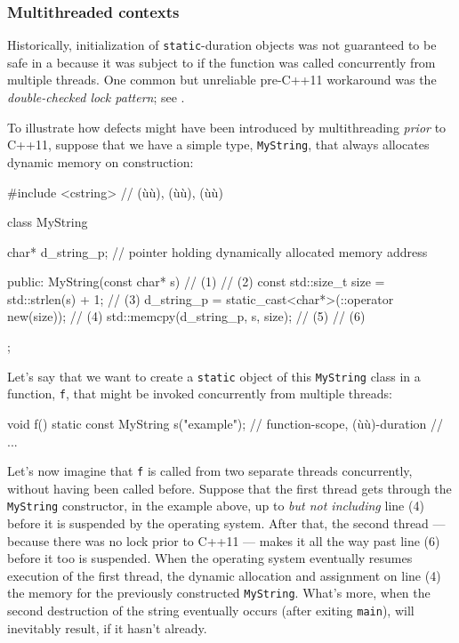 \subsubsection[Multithreaded contexts]{Multithreaded contexts}\label{multithreaded-contexts}

Historically, initialization of 
\lstinline!static!-duration objects was not guaranteed to be safe in a
 because it was subject to  if the function was called concurrently from multiple threads.
One common but unreliable pre-C++11 workaround was the
\emph{double-checked lock pattern}; see .

To illustrate how defects might have been introduced by multithreading
\emph{prior} to C++11, suppose that we have a simple type,
\lstinline!MyString!, that always allocates dynamic memory on construction:

\begin{emcppslisting}[emcppsbatch=e4]
#include <cstring>  // (ù{}ù), (ù{}ù), (ù{}ù)

class MyString
{
    char* d_string_p;  // pointer holding dynamically allocated memory address

public:
    MyString(const char* s)                                     // (1)
    {                                                           // (2)
        const std::size_t size = std::strlen(s) + 1;            // (3)
        d_string_p = static_cast<char*>(::operator new(size));  // (4)
        std::memcpy(d_string_p, s, size);                       // (5)
    }                                                           // (6)
};
\end{emcppslisting}

\noindent Let's say that we want to create a \lstinline!static! object of this
\lstinline!MyString! class in a function, \lstinline!f!, that might be invoked
concurrently from multiple threads:

\begin{emcppslisting}[emcppsbatch=e4]
void f()
{
    static const MyString s("example");  // function-scope, (ù{}ù)-duration
    // ...
}
\end{emcppslisting}

\noindent Let's now imagine that \lstinline!f! is called from
two separate threads concurrently, without having been called before. Suppose that the first thread gets
through the \lstinline!MyString! constructor, in the example above, up to
\emph{but not including} line (4) before it is suspended by the
operating system. After that, the second thread --- because there was no
lock prior to C++11 --- makes it all the way past line (6) before it too
is suspended. When the operating system eventually resumes execution of
the first thread, the dynamic allocation and assignment on line (4)
 the memory for the previously constructed
\lstinline!MyString!. What's more, when the second destruction of the
string eventually occurs (after exiting \lstinline!main!),
 will inevitably result, if it hasn't
already.

